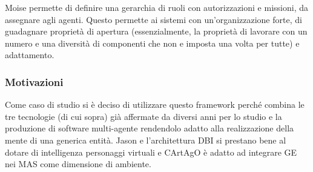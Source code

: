 Moise permette di definire una gerarchia di ruoli con autorizzazioni e missioni, da assegnare agli agenti. Questo permette ai sistemi con un'organizzazione forte, di guadagnare proprietà di apertura (essenzialmente, la proprietà di lavorare con un numero e una diversità di componenti che non e imposta una volta per tutte) e adattamento.

\subsubsection*{Motivazioni} \label{temp}

Come caso di studio si è deciso di utilizzare questo framework perché combina le tre tecnologie (di cui sopra) già affermate da diversi anni per lo studio e la produzione di software multi-agente rendendolo adatto alla realizzazione della mente di una generica entità. Jason e l'architettura DBI si prestano bene al dotare di intelligenza personaggi virtuali e CArtAgO è adatto ad integrare GE nei MAS come dimensione di ambiente.
